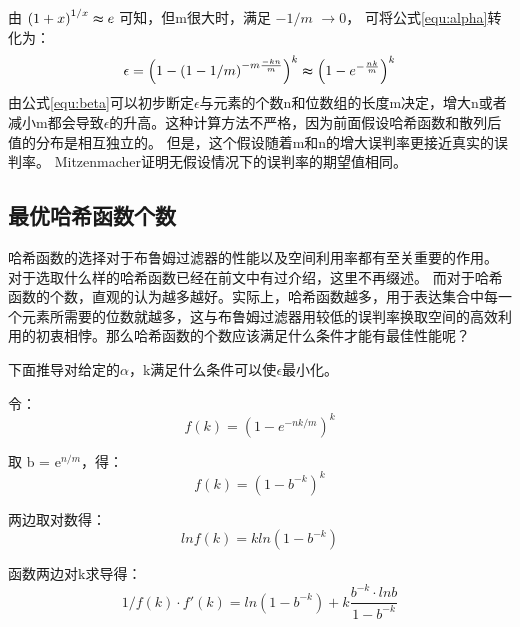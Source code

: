 由
\begin{math} \left(1 + x\right)^{{1/x}} \thickapprox e \end{math}
可知，但m很大时，满足
$-{1/m}$ $\to 0$，
可将公式\ref{equ:alpha}转化为：
\begin{equation}
\epsilon = \left(1 - \left(1 - {1/m}\right)^{{-m}\frac{-kn}{m}}\right)^k \thickapprox \left(1 - e^{-\frac{nk}{m}}\right)^k
\label{equ:beta}
\end{equation}
由公式\ref{equ:beta}可以初步断定\begin{math}\epsilon\end{math}与元素的个数n和位数组的长度m决定，增大n或者减小m都会导致\begin{math}\epsilon\end{math}的升高。这种计算方法不严格，因为前面假设哈希函数和散列后值的分布是相互独立的。
但是，这个假设随着m和n的增大误判率更接近真实的误判率。
Mitzenmacher证明无假设情况下的误判率的期望值相同\cite{mitzenmacher2002compressed}。

\subsection{最优哈希函数个数}
\label{sec:num_hashf}
哈希函数的选择对于布鲁姆过滤器的性能以及空间利用率都有至关重要的作用。
对于选取什么样的哈希函数已经在前文中有过介绍，这里不再缀述。
而对于哈希函数的个数，直观的认为越多越好。实际上，哈希函数越多，用于表达集合中每一个元素所需要的位数就越多，这与布鲁姆过滤器用较低的误判率换取空间的高效利用的初衷相悖。那么哈希函数的个数应该满足什么条件才能有最佳性能呢？

下面推导对给定的$\alpha$，k满足什么条件可以使$\epsilon$最小化。

令：
\begin{equation}
f\left(k\right) = \left(1 - e^{-{nk/m}}\right)^k 
\end{equation}

取 b = e$^{n/m}$，得：
\begin{equation}
f\left(k\right) = \left(1 - b^{-k}\right)^k 
\end{equation}

两边取对数得： 
\begin{equation}
lnf\left(k\right) = kln\left(1 - b^{-k}\right)
\end{equation}

函数两边对k求导得：
\begin{equation}
{1/f(k)}\cdot f'(k) = ln(1 - b^{-k}) + k \frac{b^{-k}\cdot lnb}{1 - b^{-k}} 
\label{equ:fk}
\end{equation}

